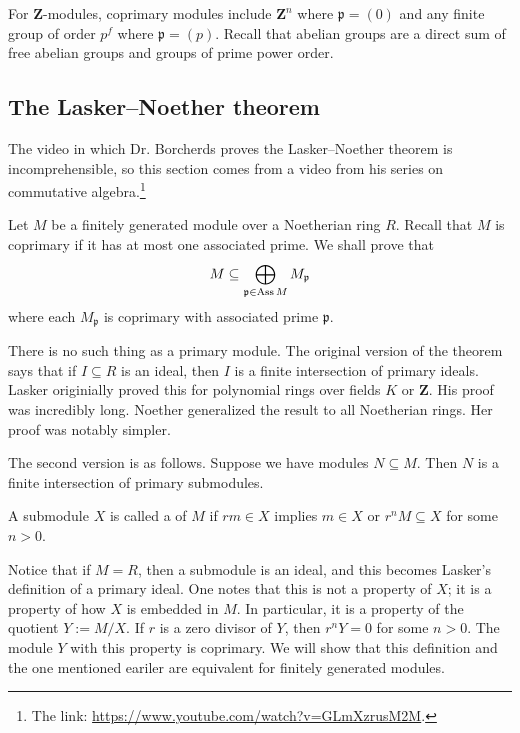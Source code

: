\documentclass[11pt, oneside,margin=1in]{article}
\begin{document}
For $\mathbf{Z}$-modules, coprimary modules include $\mathbf{Z}^n$ where $\mathfrak{p}=(0)$ and any finite group of order $p^f$ where $\mathfrak{p} = (p)$. Recall that abelian groups are a direct sum of free abelian groups and groups of prime power order.

\subsection{The Lasker--Noether theorem}
The video in which Dr. Borcherds proves the Lasker--Noether theorem is incomprehensible, so this section comes from a video from his series on commutative algebra.\footnote{The link: \url{https://www.youtube.com/watch?v=GLmXzrusM2M}.}

Let $M$ be a finitely generated module over a Noetherian ring $R$. Recall that $M$ is coprimary if it has at most one associated prime. We shall prove that
\begin{align*}
	M \subseteq \bigoplus_{\mathfrak{p}\in \operatorname{Ass} M} M_{\mathfrak{p}}
\end{align*}
where each $M_{\mathfrak{p}}$ is coprimary with associated prime $ \mathfrak{p}$. 

There is no such thing as a primary module. The original version of the theorem says that if $I\subseteq R$ is an ideal, then $I$ is a finite intersection of primary ideals. Lasker originially proved this for polynomial rings over fields $K$ or $\mathbf{Z}$. His proof was incredibly long. Noether generalized the result to all Noetherian rings. Her proof was notably simpler.

The second version is as follows. Suppose we have modules $N\subseteq M$. Then $N$ is a finite intersection of primary submodules.

\begin{definition}[ ]\label{}\text{}
A submodule $X$ is called a  of $M$ if $rm\in X$ implies $m\in X$ or $r^nM\subseteq X$ for some $n>0$.
\end{definition}

Notice that if $M=R$, then a submodule is an ideal, and this becomes Lasker's definition of a primary ideal. One notes that this is not a property of $X$; it is a property of how $X$ is embedded in $M$. In particular, it is a property of the quotient $Y:= M/X$. If $r$ is a zero divisor of $Y$, then $r^nY=0$ for some $n>0$. The module $Y$ with this property is coprimary. We will show that this definition and the one mentioned eariler are equivalent for finitely generated modules.
\end{document}
